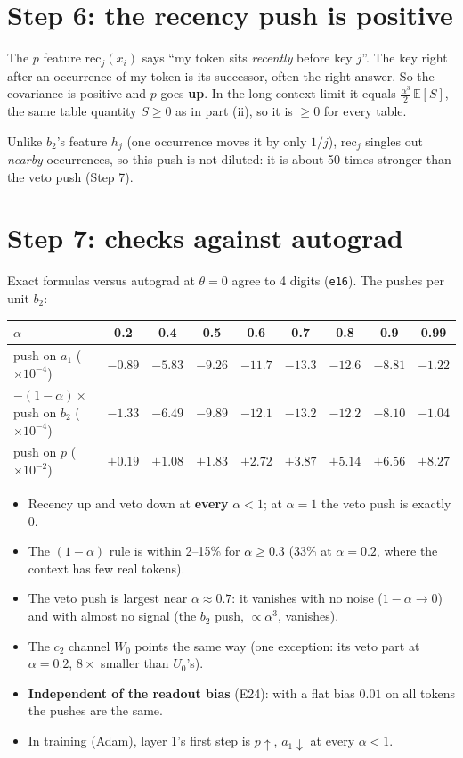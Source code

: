 \documentclass[11pt]{article}
\newcommand{\1}{\mathbf{1}}
\begin{document}
\section{Step 6: the recency push is positive}
The $p$ feature $\mathrm{rec}_j(x_i)$ says ``my token sits \emph{recently} before key $j$''. The key right after an
occurrence of my token is its successor, often the right answer. So the covariance is positive and $p$ goes
\textbf{up}. In the long-context limit it equals $\tfrac{\alpha^3}{2}\,\mathbb E[S]$, the same table quantity $S\ge0$ as in
part (ii), so it is $\ge0$ for every table.

Unlike $b_2$'s feature $h_j$ (one occurrence moves it by only $1/j$), $\mathrm{rec}_j$ singles out \emph{nearby}
occurrences, so this push is not diluted: it is about 50 times stronger than the veto push (Step 7).

\section{Step 7: checks against autograd}
Exact formulas versus autograd at $\theta=0$ agree to 4 digits (\texttt{e16}). The pushes per unit $b_2$:
\begin{center}
\small\setlength{\tabcolsep}{4pt}\begin{tabular}{lcccccccc}\toprule
$\alpha$ & 0.2 & 0.4 & 0.5 & 0.6 & 0.7 & 0.8 & 0.9 & 0.99\\\midrule
push on $a_1$ ($\times10^{-4}$) & $-0.89$ & $-5.83$ & $-9.26$ & $-11.7$ & $-13.3$ & $-12.6$ & $-8.81$ & $-1.22$\\
$-(1-\alpha)\times$ push on $b_2$ ($\times10^{-4}$) & $-1.33$ & $-6.49$ & $-9.89$ & $-12.1$ & $-13.2$ & $-12.2$ & $-8.10$ & $-1.04$\\
push on $p$ ($\times10^{-2}$) & $+0.19$ & $+1.08$ & $+1.83$ & $+2.72$ & $+3.87$ & $+5.14$ & $+6.56$ & $+8.27$\\\bottomrule
\end{tabular}
\end{center}
\begin{itemize}
\item Recency up and veto down at \textbf{every} $\alpha<1$; at $\alpha=1$ the veto push is exactly $0$.
\item The $(1-\alpha)$ rule is within 2--15\% for $\alpha\ge0.3$ (33\% at $\alpha=0.2$, where the context has few real tokens).
\item The veto push is largest near $\alpha\approx0.7$: it vanishes with no noise ($1-\alpha\to0$) and with almost no
signal (the $b_2$ push, $\propto\alpha^3$, vanishes).
\item The $c_2$ channel $W_0$ points the same way (one exception: its veto part at $\alpha=0.2$, $8\times$ smaller than $U_0$'s).
\item \textbf{Independent of the readout bias} (E24): with a flat bias $0.01$ on all tokens the pushes are the same.
\item In training (Adam), layer 1's first step is $p\uparrow$, $a_1\downarrow$ at every $\alpha<1$.
\end{itemize}
\end{document}
